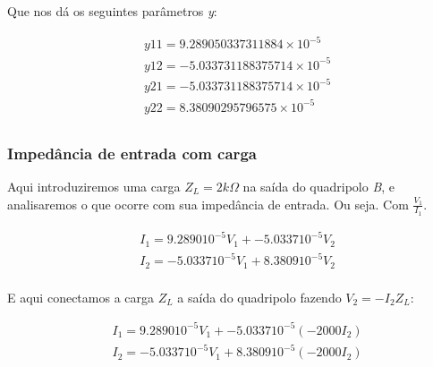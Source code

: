 \documentclass[12pt,twoside, a4paper, twocolumn]{article}
\begin{document}
Que nos dá os seguintes parâmetros \emph{y}:


\begin{equation}
    \begin{aligned}
         & y11 = 9.289050337311884 \times 10^{-5}  \\
         & y12 = -5.033731188375714 \times 10^{-5} \\
         & y21 = -5.033731188375714 \times 10^{-5} \\
         & y22 = 8.38090295796575 \times 10^{-5}   \\
    \end{aligned}
\end{equation}


\subsubsection{Impedância de  entrada com carga}


Aqui introduziremos uma carga $Z_L = 2k \varOmega$ na saída do quadripolo \emph{B}, e analisaremos o que ocorre com sua impedância de entrada. Ou seja. Com $\frac{V_1}{I_1}.$


\begin{equation}
    \begin{aligned}
         & I_1 = 9.2890 10^{-5} V_1 + -5.0337 10^{-5} V_2 \\
         & I_2 = -5.0337 10^{-5} V_1 + 8.3809 10^{-5} V_2 \\
    \end{aligned}
\end{equation}


E aqui conectamos a carga $Z_L$ a saída do quadripolo fazendo $V_2 = -I_2 Z_L$:


\begin{equation}
    \begin{aligned}
         & I_1 = 9.2890 10^{-5} V_1 + -5.0337 10^{-5}  (-2000 I_2) \\
         & I_2 = -5.0337 10^{-5} V_1 + 8.3809 10^{-5} (-2000 I_2)  \\
    \end{aligned}
\end{equation}


\paragraph*{}
\paragraph*{}
\end{document}
